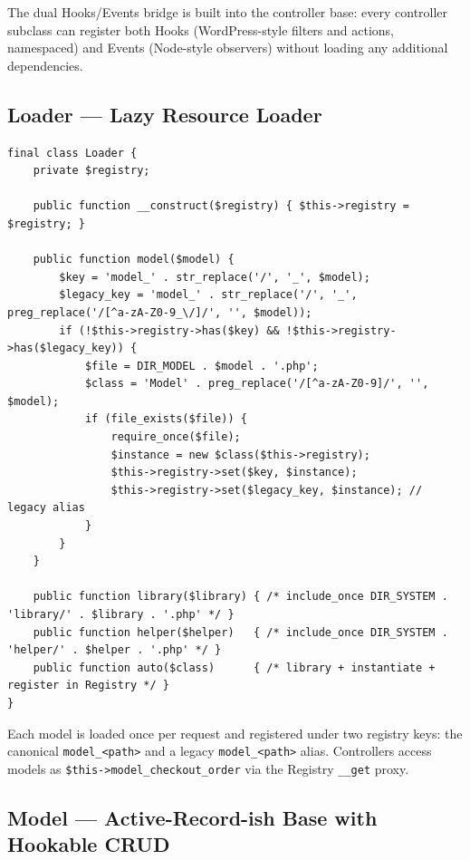 \documentclass[11pt,a4paper]{article}
\begin{document}
The dual Hooks/Events bridge is built into the controller base: every
controller subclass can register both Hooks (WordPress-style filters
and actions, namespaced) and Events (Node-style observers) without
loading any additional dependencies.

\subsection{Loader --- Lazy Resource Loader}

\begin{lstlisting}[caption={\texttt{system/engine/loader.php} --- model loading (abridged).},label={lst:loader}]
final class Loader {
    private $registry;

    public function __construct($registry) { $this->registry = $registry; }

    public function model($model) {
        $key = 'model_' . str_replace('/', '_', $model);
        $legacy_key = 'model_' . str_replace('/', '_', preg_replace('/[^a-zA-Z0-9_\/]/', '', $model));
        if (!$this->registry->has($key) && !$this->registry->has($legacy_key)) {
            $file = DIR_MODEL . $model . '.php';
            $class = 'Model' . preg_replace('/[^a-zA-Z0-9]/', '', $model);
            if (file_exists($file)) {
                require_once($file);
                $instance = new $class($this->registry);
                $this->registry->set($key, $instance);
                $this->registry->set($legacy_key, $instance); // legacy alias
            }
        }
    }

    public function library($library) { /* include_once DIR_SYSTEM . 'library/' . $library . '.php' */ }
    public function helper($helper)   { /* include_once DIR_SYSTEM . 'helper/' . $helper . '.php' */ }
    public function auto($class)      { /* library + instantiate + register in Registry */ }
}
\end{lstlisting}

Each model is loaded once per request and registered under two
registry keys: the canonical \texttt{model\_<path>} and a legacy
\texttt{model\_<path>} alias. Controllers access models as
\texttt{\$this->model\_checkout\_order} via the Registry
\texttt{\_\_get} proxy.

\subsection{Model --- Active-Record-ish Base with Hookable CRUD}
\end{document}
